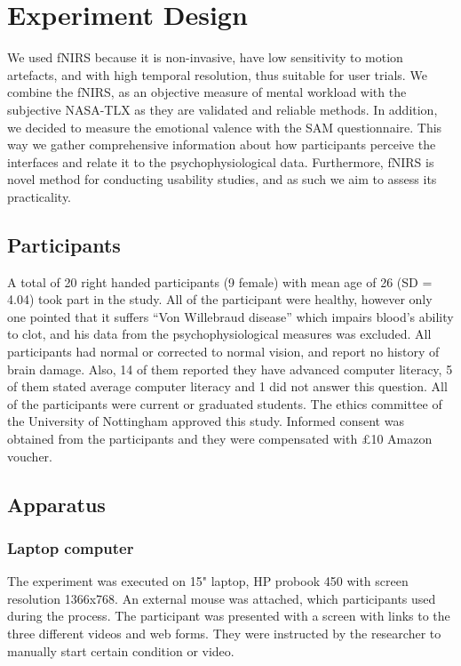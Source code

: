 \documentclass[../main/Feedback.tex]{subfiles}
\begin{document}
\section{Experiment Design}
We used fNIRS because it is non-invasive, have low sensitivity to motion artefacts, and with high temporal resolution, thus suitable for user trials. We combine the fNIRS, as an objective measure of mental workload with the subjective NASA-TLX as they are validated and reliable methods. In addition, we decided to measure the emotional valence with the SAM questionnaire. This way we gather comprehensive information about how participants perceive the interfaces and relate it to the psychophysiological data. Furthermore, fNIRS is novel method for conducting usability studies, and as such we aim to assess its practicality.

\subsection{Participants}
A total of 20 right handed participants (9 female) with mean age of 26 (SD = 4.04) took part in the study. All of the participant were healthy, however only one pointed that it suffers ``Von Willebraud disease'' which impairs blood's ability to clot, and his data from the psychophysiological measures was excluded. All participants had normal or corrected to normal vision, and report no history of brain damage. Also, 14 of them reported they have advanced computer literacy, 5 of them stated average computer literacy and 1 did not answer this question. All of the participants were current or graduated students. The ethics committee of the University of Nottingham approved this study. Informed consent was obtained from the participants and they were compensated with £10 Amazon voucher.
\subsection{Apparatus}
\subsubsection{Laptop computer}
The experiment was executed on 15" laptop, HP probook 450 with screen resolution 1366x768. An external mouse was attached, which participants used during the process. The participant was presented with a screen with links to the three different videos and web forms. They were instructed by the researcher to manually start certain condition or video. 
\end{document}
